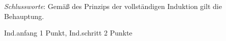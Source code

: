 \documentclass[12pt]{article}
\begin{document}
\begin{loesung}
\begin{enumerate}
          \emph{Schlussworte}: Gemäß des Prinzips der vollständigen Induktion
          gilt die Behauptung.

          \begin{korrektur}
            Ind.anfang 1 Punkt, Ind.schritt 2 Punkte
          \end{korrektur}
  \end{enumerate}
\end{loesung}

\end{document}
